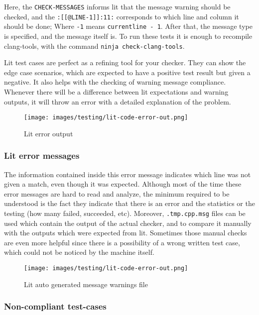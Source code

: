 Here, the \lstinline{CHECK-MESSAGES} informs lit that the message warning should be checked, and the \lstinline{:[[@LINE-1]]:11:} corresponds to which line and column it should be done; Where \lstinline{-1} means \lstinline{currentline - 1}. After that, the message type is specified, and the message itself is. To run these tests it is enough to recompile clang-tools, with the command \lstinline{ninja check-clang-tools}. 

Lit test cases are perfect as a refining tool for your checker. They can show the edge case scenarios, which are expected to have a positive test result but given a negative. It also helps with the checking of warning message compliance. Whenever there will be a difference between lit expectations and warning outputs, it will throw an error with a detailed explanation of the problem.

\begin{figure}[H]
	\centering
	\caption{Lit error output}
	\texttt{[image: images/testing/lit-code-error-out.png]}
	\label{fig:lit-test-err-out}
\end{figure}

\subsubsection{Lit error messages}

The information contained inside this error message indicates which line was not given a match, even though it was expected. Although most of the time these error messages are hard to read and analyze, the minimum required to be understood is the fact they indicate that there is an error and the statistics or the testing (how many failed, succeeded, etc). Moreover, \lstinline{.tmp.cpp.msg} files can be used which contain the output of the actual checker, and to compare it manually with the outputs which were expected from lit. Sometimes those manual checks are even more helpful since there is a possibility of a wrong written test case, which could not be noticed by the machine itself.

\begin{figure}[H]
	\centering
	\caption{Lit auto generated message warnings file}
	\texttt{[image: images/testing/lit-code-error-out.png]}
	\label{fig:lit-test-msg-file}
\end{figure}

\subsubsection{Non-compliant test-cases}

